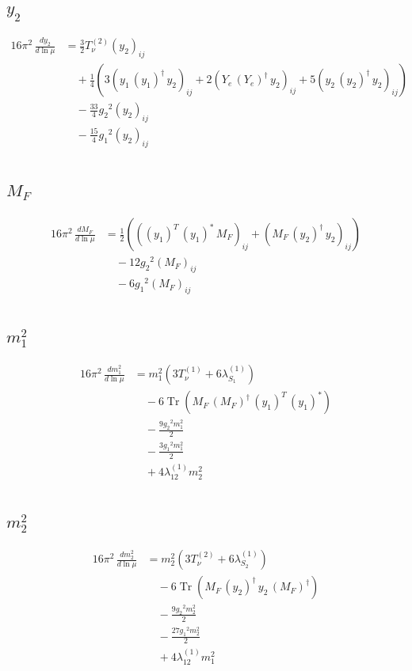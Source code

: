\documentclass[10pt,a4paper]{article}
\begin{document}
\subsection*{$y_2$}
\begin{align*}
16\pi^2\,\frac{d y_2}{d\ln\mu} &=\frac{3}{2} T_{\nu}^{(2)} \left({y_2}\right)_{ij} \\
&\quad +\frac{1}{4} (3 \left({y_1}\,\left({y_1}\right)^{\dagger}\,{y_2}\right)_{ij}+2 \left({Y_e}\,\left({Y_e}\right)^{\dagger}\,{y_2}\right)_{ij}+5 \left({y_2}\,\left({y_2}\right)^{\dagger}\,{y_2}\right)_{ij}) \\
&\quad -\frac{33}{4} {g_2}^2 \left({y_2}\right)_{ij} \\
&\quad -\frac{15}{4} {g_1}^2 \left({y_2}\right)_{ij} \\
\end{align*}
\subsection*{$M_F$}
\begin{align*}
16\pi^2\,\frac{d M_F}{d\ln\mu} &=\frac{1}{2} (\left(\left({y_1}\right)^{T}\,\left({y_1}\right)^{*}\,{M_F}\right)_{ij}+\left({M_F}\,\left({y_2}\right)^{\dagger}\,{y_2}\right)_{ij}) \\
&\quad -12 {g_2}^2 \left({M_F}\right)_{ij} \\
&\quad -6 {g_1}^2 \left({M_F}\right)_{ij} \\
\end{align*}
\subsection*{$m_1^2$}
\begin{align*}
16\pi^2\,\frac{d m_1^2}{d\ln\mu} &={m_1^2} (3 T_{\nu}^{(1)}+6 {\lambda_{S_1}^{(1)}}) \\
&\quad -6 \operatorname{Tr}\!\left({M_F}\,\left({M_F}\right)^{\dagger}\,\left({y_1}\right)^{T}\,\left({y_1}\right)^{*}\right) \\
&\quad -\frac{9 {g_2}^2 {m_1^2}}{2} \\
&\quad -\frac{3 {g_1}^2 {m_1^2}}{2} \\
&\quad +4 {\lambda_{12}^{(1)}} {m_2^2} \\
\end{align*}
\subsection*{$m_2^2$}
\begin{align*}
16\pi^2\,\frac{d m_2^2}{d\ln\mu} &={m_2^2} (3 T_{\nu}^{(2)}+6 {\lambda_{S_2}^{(1)}}) \\
&\quad -6 \operatorname{Tr}\!\left({M_F}\,\left({y_2}\right)^{\dagger}\,{y_2}\,\left({M_F}\right)^{\dagger}\right) \\
&\quad -\frac{9 {g_2}^2 {m_2^2}}{2} \\
&\quad -\frac{27 {g_1}^2 {m_2^2}}{2} \\
&\quad +4 {\lambda_{12}^{(1)}} {m_1^2} \\
\end{align*}
\end{document}
